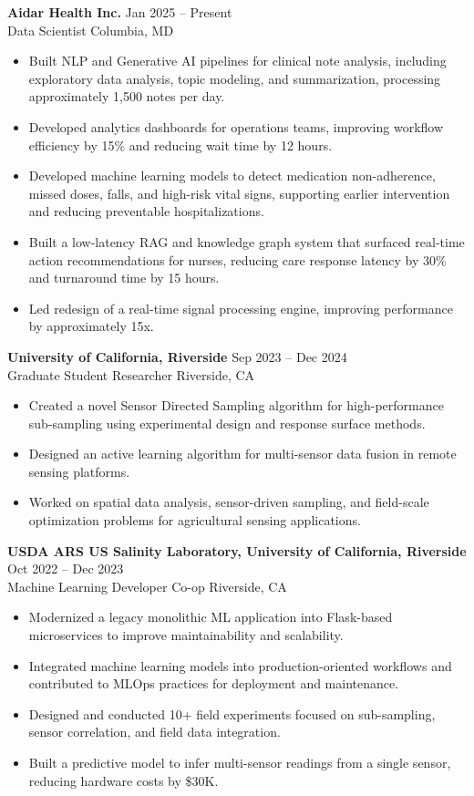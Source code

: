 \documentclass[10pt,letterpaper]{article}
\newcommand{\resumeSubheading}[4]{
    \textbf{#1} \hfill #2 \\
    #3 \hfill #4 \\
}
\newcommand{\resumeItem}[1]{
    \item #1
}
\begin{document}
\resumeSubheading
{Aidar Health Inc.}{Jan 2025 -- Present}
{Data Scientist}{Columbia, MD}
\begin{itemize}[leftmargin=*, itemsep=2pt, topsep=2pt]
    \resumeItem{Built NLP and Generative AI pipelines for clinical note analysis, including exploratory data analysis, topic modeling, and summarization, processing approximately 1,500 notes per day.}
    \resumeItem{Developed analytics dashboards for operations teams, improving workflow efficiency by 15\% and reducing wait time by 12 hours.}
    \resumeItem{Developed machine learning models to detect medication non-adherence, missed doses, falls, and high-risk vital signs, supporting earlier intervention and reducing preventable hospitalizations.}
    \resumeItem{Built a low-latency RAG and knowledge graph system that surfaced real-time action recommendations for nurses, reducing care response latency by 30\% and turnaround time by 15 hours.}
    \resumeItem{Led redesign of a real-time signal processing engine, improving performance by approximately 15x.}
\end{itemize}

\resumeSubheading
{University of California, Riverside}{Sep 2023 -- Dec 2024}
{Graduate Student Researcher}{Riverside, CA}
\begin{itemize}[leftmargin=*, itemsep=2pt, topsep=2pt]
    \resumeItem{Created a novel Sensor Directed Sampling algorithm for high-performance sub-sampling using experimental design and response surface methods.}
    \resumeItem{Designed an active learning algorithm for multi-sensor data fusion in remote sensing platforms.}
    \resumeItem{Worked on spatial data analysis, sensor-driven sampling, and field-scale optimization problems for agricultural sensing applications.}
\end{itemize}

\resumeSubheading
{USDA ARS US Salinity Laboratory, University of California, Riverside}{Oct 2022 -- Dec 2023}
{Machine Learning Developer Co-op}{Riverside, CA}
\begin{itemize}[leftmargin=*, itemsep=2pt, topsep=2pt]
    \resumeItem{Modernized a legacy monolithic ML application into Flask-based microservices to improve maintainability and scalability.}
    \resumeItem{Integrated machine learning models into production-oriented workflows and contributed to MLOps practices for deployment and maintenance.}
    \resumeItem{Designed and conducted 10+ field experiments focused on sub-sampling, sensor correlation, and field data integration.}
    \resumeItem{Built a predictive model to infer multi-sensor readings from a single sensor, reducing hardware costs by \$30K.}
\end{itemize}
\end{document}
